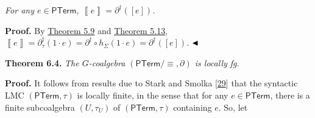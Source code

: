 \documentclass[11pt,a4paper]{amsart}
\begin{document}
\hypertarget{html:S6.Thmtheorem3.p1}{} \emph{For any %
\hypertarget{html:S6.Thmtheorem3.p1.m1}{}\({e\in\mathsf{PTerm}}\), %
\hypertarget{html:S6.Thmtheorem3.p1.m2}{}\({\left\llbracket{e}\right\rrbracket=\partial^{\dagger}([e])}\).}
\par\medskip
\hypertarget{html:S6.SS0.SSS0.P0.SPx2}{} \par\noindent\textbf{Proof.}\quad  %
\hypertarget{html:S6.SS0.SSS0.P0.SPx2.p1}{} By \hyperlink{html:S5.Thmtheorem9}{Theorem 5.9} and \hyperlink{html:S5.Thmtheorem13}{Theorem 5.13}, %
\hypertarget{html:S6.SS0.SSS0.P0.SPx2.p1.m1}{}\({\left\llbracket{e}\right\rrbracket=\partial_{\tau}^{\dagger}(1\cdot e)=\partial^{\dagger}\circ h_{\Sigma}(1\cdot e)=\partial^{\dagger}([e])}\). %
\hypertarget{html:S6.SS0.SSS0.P0.SPx2.p1.m2}{}\({\hfill\blacktriangleleft}\)
\par\medskip
\hypertarget{html:S6.Thmtheorem4}{} \par\noindent\textbf{\textbf{Theorem 6.4}\textbf{.}}\quad  %
\hypertarget{html:S6.Thmtheorem4.p1}{} \emph{The %
\hypertarget{html:S6.Thmtheorem4.p1.m1}{}\({G}\)-coalgebra %
\hypertarget{html:S6.Thmtheorem4.p1.m2}{}\({(\mathsf{PTerm}/{\equiv},\partial)}\) is locally fg.}
\par\medskip
\hypertarget{html:S6.SS0.SSS0.P0.SPx3}{} \par\noindent\textbf{Proof.}\quad  %
\hypertarget{html:S6.SS0.SSS0.P0.SPx3.p1}{} It follows from results due to Stark and Smolka [\hyperlink{html:bib.bib29}{29}] that the syntactic LMC %
\hypertarget{html:S6.SS0.SSS0.P0.SPx3.p1.m1}{}\({(\mathsf{PTerm},\tau)}\) is locally finite, in the sense that for any %
\hypertarget{html:S6.SS0.SSS0.P0.SPx3.p1.m2}{}\({e\in\mathsf{PTerm}}\), there is a finite subcoalgebra %
\hypertarget{html:S6.SS0.SSS0.P0.SPx3.p1.m3}{}\({(U,\tau_{U})}\) of %
\hypertarget{html:S6.SS0.SSS0.P0.SPx3.p1.m4}{}\({(\mathsf{PTerm},\tau)}\) containing %
\hypertarget{html:S6.SS0.SSS0.P0.SPx3.p1.m5}{}\({e}\). So, let %
\end{document}
